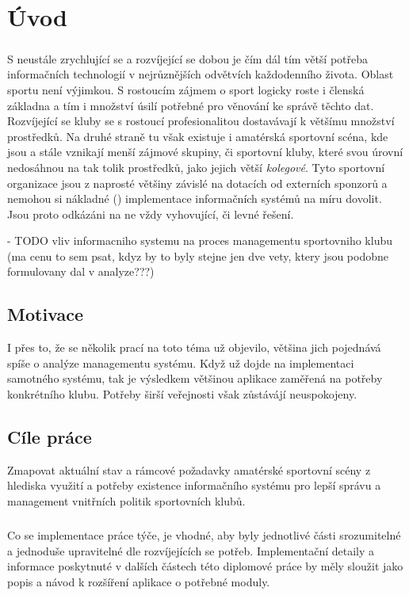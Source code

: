 \documentclass[11pt,oneside]{fithesis}
\begin{document}
\chapter{Úvod}
\paragraph*{}
S neustále zrychlující se a rozvíjející se dobou je čím dál tím větší potřeba informačních technologií v nejrůznějších odvětvích každodenního života. Oblast sportu není výjimkou. S rostoucím zájmem o sport logicky roste i členská základna a tím i množství úsilí potřebné pro věnování ke správě těchto dat. Rozvíjející se kluby se s rostoucí profesionalitou dostavávají k většímu množství prostředků.
Na druhé straně tu však existuje i amatérská sportovní scéna, kde jsou a stále vznikají menší zájmové skupiny, či sportovní kluby, které svou úrovní nedosáhnou na tak tolik prostředků, jako jejich větší \textit{kolegové}. Tyto sportovní organizace jsou z naprosté většiny závislé na dotacích od externích sponzorů a nemohou si nákladné (\cite{analyza-sis}) implementace informačních systémů na míru dovolit. Jsou proto odkázáni na ne vždy vyhovující, či levné řešení. 


- TODO vliv informacniho systemu na proces managementu sportovniho klubu (ma cenu to sem psat, kdyz by to byly stejne jen dve vety, ktery jsou podobne formulovany dal v analyze???)
        \section{Motivace}

        I přes to, že se několik prací na toto téma už objevilo, většina jich pojednává spíše o analýze managementu systému. Když už dojde na implementaci samotného systému, tak je výsledkem většinou aplikace zaměřená na potřeby konkrétního klubu. Potřeby širší veřejnosti však zůstávájí neuspokojeny.

        \section{Cíle práce}

        Zmapovat aktuální stav a rámcové požadavky amatérské sportovní scény z hlediska využití a potřeby existence informačního systému pro lepší správu a management vnitřních politik sportovních klubů.
        \paragraph*{}
        Co se implementace práce týče, je vhodné, aby byly jednotlivé části srozumitelné a jednoduše upravitelné dle rozvíjejících se potřeb. Implementační detaily a informace poskytnuté v dalších částech této diplomové práce by měly sloužit jako popis a návod k rozšíření aplikace o potřebné moduly.
\end{document}
